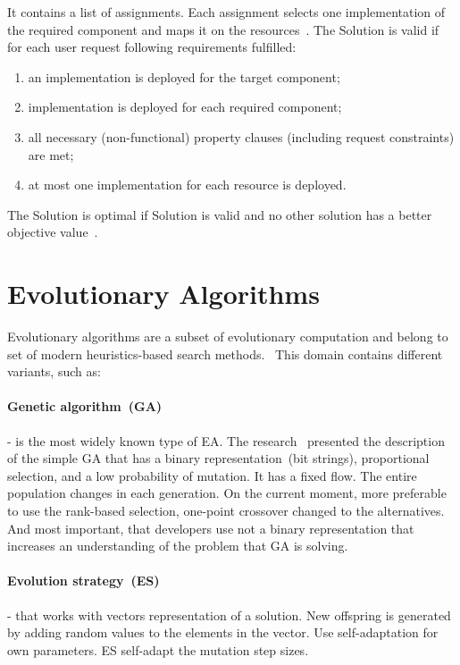 It contains a list of assignments. Each assignment selects one implementation of the required component and maps it on the resources~\cite{gotz18}.
The Solution is valid if for each user request following requirements fulfilled:

\begin{enumerate}
	\item an implementation is deployed for the target component;
	\item implementation is deployed for each required component;
	\item all necessary (non-functional) property clauses (including request constraints) are met;
	\item at most one implementation for each resource is deployed.
\end{enumerate}

The Solution is optimal if Solution is valid and no other solution has a better objective value~\cite{gotz18}.

\section{Evolutionary Algorithms}
\label{sec:GeneticAlgorithm}

Evolutionary algorithms are a subset of evolutionary computation and belong to set of modern heuristics-based search methods.~\cite{vikhar16}
This domain contains different variants, such as:
\paragraph{Genetic algorithm~(GA)} - is the most widely known type of EA\cite{eiben03}. The research~\cite{deJong75} presented the description of the simple GA that has a binary representation~(bit strings), proportional selection, and a low probability of mutation. It has a fixed flow. The entire population changes in each generation. On the current moment, more preferable to use the rank-based selection, one-point crossover changed to the alternatives. And most important, that developers use not a binary representation that increases an understanding of the problem that GA is solving.
\paragraph{Evolution strategy~(ES)} - that works with vectors representation of a solution. New offspring is generated by adding random values to the elements in the vector. Use self-adaptation for own parameters. ES self-adapt the mutation step sizes.
